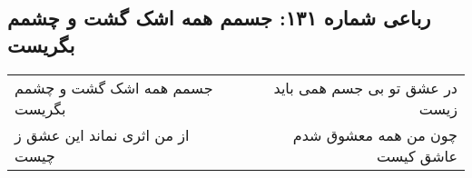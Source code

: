 \begin{center}
\section*{رباعی شماره ۱۳۱: جسمم همه اشک گشت و چشمم بگریست}
\label{sec:sh131}
\begin{longtable}{l p{0.5cm} r}
جسمم همه اشک گشت و چشمم بگریست
&&
در عشق تو بی جسم همی باید زیست
\\
از من اثری نماند این عشق ز چیست
&&
چون من همه معشوق شدم عاشق کیست
\\
\end{longtable}
\end{center}
